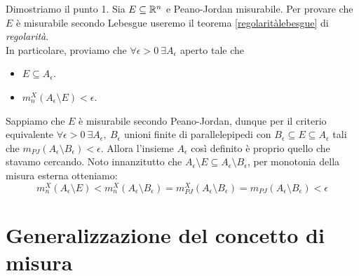 \begin{demonstration}
	Dimostriamo il punto 1. Sia $E\subseteq \mathbb{R}^n$ e Peano-Jordan misurabile. Per provare che $E$ è misurabile secondo Lebesgue useremo il teorema \ref{regolaritàlebesgue} di \textit{regolarità}.\\
	In particolare, proviamo che $\forall \epsilon >0\ \exists A_{\epsilon}$ aperto tale che
	\begin{itemize}
		\item $E\subseteq A_{\epsilon}$.
		\item $m_n^{X}\left(A_{\epsilon}\setminus E\right)<\epsilon$.
	\end{itemize}
Sappiamo che $E$ è misurabile secondo Peano-Jordan, dunque per il criterio equivalente $\forall \epsilon >0 \ \exists A_{\epsilon},\ B_{\epsilon}$ unioni finite di parallelepipedi con $B_{\epsilon}\subseteq E\subseteq A_{\epsilon}$ tali che $m_{PJ}\left(A_{\epsilon}\setminus B_{\epsilon}\right)<\epsilon$. Allora l'insieme $A_{\epsilon}$ così definito è proprio quello che stavamo cercando. Noto innanzitutto che $A_{\epsilon}\setminus E\subseteq A_{\epsilon}\setminus B_{\epsilon}$, per monotonia della misura esterna otteniamo:
\begin{equation*}
	m_{n}^{X}\left(A_{\epsilon}\setminus E\right)<	m_{n}^{X}\left(A_{\epsilon}\setminus B_{\epsilon}\right)=m_{PJ}^X\left(A_{\epsilon}\setminus B_{\epsilon}\right)=m_{PJ}\left(A_{\epsilon}\setminus B_{\epsilon}\right)<\epsilon
\end{equation*}
\end{demonstration}
\section{Generalizzazione del concetto di misura}
